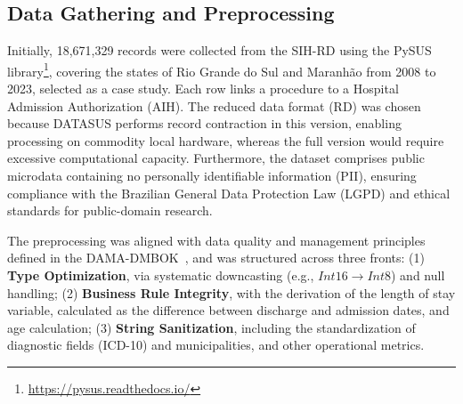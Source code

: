 \documentclass[conference]{IEEEtran}
\begin{document}
\subsection{Data Gathering and Preprocessing}

Initially, 18,671,329 records were collected from the SIH-RD using the PySUS library\footnote{\url{https://pysus.readthedocs.io/}}, covering the states of Rio Grande do Sul and Maranhão from 2008 to 2023, selected as a case study. Each row links a procedure to a Hospital Admission Authorization (AIH). The reduced data format (RD) was chosen because DATASUS performs record contraction in this version, enabling processing on commodity local hardware, whereas the full version would require excessive computational capacity. Furthermore, the dataset comprises public microdata containing no personally identifiable information (PII), ensuring compliance with the Brazilian General Data Protection Law (LGPD) and ethical standards for public-domain research.

The preprocessing was aligned with data quality and management principles defined in the DAMA-DMBOK~\cite{dama2017}, and was structured across three fronts: (1) \textbf{Type Optimization}, via systematic downcasting (e.g., $Int16 \rightarrow Int8$) and null handling; (2) \textbf{Business Rule Integrity}, with the derivation of the length of stay variable, calculated as the difference between discharge and admission dates, and age calculation; (3) \textbf{String Sanitization}, including the standardization of diagnostic fields (ICD-10) and municipalities, and other operational metrics.
\end{document}
